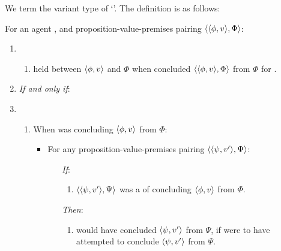 \begin{note}
  We term the variant type of \support{} `\zSX{}'.
  The definition is as follows:
  \begin{definition}[\zSX{}]
    \label{idea:zSX}
    For an agent \vAgent{}, and proposition-value-premises pairing \(\langle \langle \phi, v \rangle, \Phi \rangle\):
    \begin{enumerate}[label=]
    \item
      \begin{enumerate}[label=]
      \item
        \zSX{} held between \(\langle \phi, v \rangle\) and \(\Phi\) when \vAgent{} concluded \(\langle \langle \phi, v \rangle, \Phi \rangle\) from \(\Phi\) for \vAgent{}.
      \end{enumerate}
    \item \emph{If and only if}:
    \item
      \begin{enumerate}[label=]
      \item
        When \vAgent{} was concluding \(\langle \phi, v \rangle\) from \(\Phi\):
        \begin{itemize}
        \item
          For any proposition-value-premises pairing \(\langle \langle \psi, v' \rangle, \Psi \rangle\):
          \begin{enumerate}[label=]
          \item[\emph{If}:]
            \begin{enumerate}[label=\alph*., ref=(\alph*)]
            \item
              \label{question:zsX:option}
              \(\langle \langle \psi, v' \rangle, \Psi \rangle\) was a \requ{} of concluding \(\langle \phi, v \rangle\) from \(\Phi\).
            \end{enumerate}
          \item[\emph{Then}:]
            \begin{enumerate}[label=\alph*., ref=(\alph*), resume]
            \item
              \label{question:zsX:may-fail}
              \vAgent{} would have concluded \(\langle \psi, v' \rangle\) from \(\Psi\), if \vAgent{} were to have attempted to conclude \(\langle \psi, v' \rangle\) from \(\Psi\).
            \end{enumerate}
          \end{enumerate}
        \end{itemize}
      \end{enumerate}
    \end{enumerate}
    \vspace{-\baselineskip}
  \end{definition}
\end{note}

